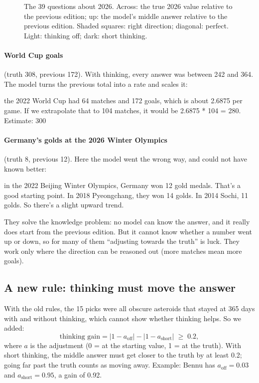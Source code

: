 \documentclass[11pt,a4paper]{article}
\begin{document}
\begin{figure}[ht]
\centering{}
\caption{The 39 questions about 2026. Across: the true 2026 value relative to the previous edition; up: the model's middle answer relative to the previous edition. Shaded squares: right direction; diagonal: perfect. Light: thinking off; dark: short thinking.}
\label{fig:events}
\end{figure}

\paragraph{World Cup goals} (truth 308, previous 172). With thinking, every answer was between 242 and 364. The model turns the previous total into a rate and scales it:
\begin{transcript}
\cut{} the 2022 World Cup had 64 matches and 172 goals, which is about 2.6875 per game. If we extrapolate that to 104 matches, it would be 2.6875 * 104 = 280. \cut{} Estimate: 300
\end{transcript}

\paragraph{Germany's golds at the 2026 Winter Olympics} (truth 8, previous 12). Here the model went the wrong way, and could not have known better:
\begin{transcript}
\cut{} in the 2022 Beijing Winter Olympics, Germany won 12 gold medals. That's a good starting point. \cut{} In 2018 Pyeongchang, they won 14 golds. In 2014 Sochi, 11 golds. So there's a slight upward trend. \cut{}
\end{transcript}

\begin{keybox}
They solve the knowledge problem: no model can know the answer, and it really does start from the previous edition. But it cannot know whether a number went up or down, so for many of them \enquote{adjusting towards the truth} is luck. They work only where the direction can be reasoned out (more matches mean more goals).
\end{keybox}

\subsection{A new rule: thinking must move the answer}
With the old rules, the 15 picks were all obscure asteroids that stayed at 365 days with and without thinking, which cannot show whether thinking helps. So we added:
\[ \text{thinking gain} = |1 - a_{\text{off}}| - |1 - a_{\text{short}}| \;\geq\; 0.2, \]
where $a$ is the adjustment (0 = at the starting value, 1 = at the truth). With short thinking, the middle answer must get closer to the truth by at least 0.2; going far past the truth counts as moving away. Example: Bennu has $a_{\text{off}} = 0.03$ and $a_{\text{short}} = 0.95$, a gain of 0.92.
\end{document}
